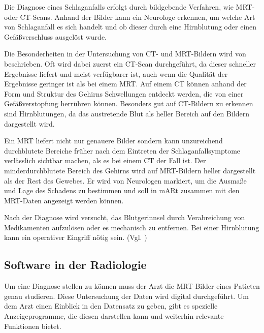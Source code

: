Die Diagnose eines Schlaganfalls erfolgt durch bildgebende Verfahren, wie MRT- oder CT-Scans. Anhand der Bilder kann ein Neurologe erkennen, um welche Art von Schlaganfall es sich handelt und ob dieser durch eine Hirnblutung oder einen Gefäßverschluss ausgelöst wurde. 

Die Besonderheiten in der Untersuchung von CT- und MRT-Bildern wird von \citet{schlaganfallBilder} beschrieben.
Oft wird dabei zuerst ein CT-Scan durchgeführt, da dieser schneller Ergebnisse liefert und meist verfügbarer ist, auch wenn die Qualität der Ergebnisse geringer ist als bei einem MRT. 
Auf einem CT können anhand der Form und Struktur des Gehirns Schwellungen entdeckt werden, die von einer Gefäßverstopfung herrühren können. Besonders gut auf CT-Bildern zu erkennen sind Hirnblutungen, da das austretende Blut als heller Bereich auf den Bildern dargestellt wird. 

Ein MRT liefert nicht nur genauere Bilder sondern kann unzureichend durchblutete Bereiche früher nach dem Eintreten der Schlaganfallsymptome verlässlich sichtbar machen, als es bei einem CT der Fall ist.
Der minderdurchblutete Bereich des Gehirns wird auf MRT-Bildern heller dargestellt als der Rest des Gewebes. Er wird von Neurologen markiert, um die Ausmaße und Lage des Schadens zu bestimmen und soll in mARt zusammen mit den MRT-Daten angezeigt werden können.

Nach der Diagnose wird versucht, das Blutgerinnsel durch Verabreichung von Medikamenten aufzulösen oder es mechanisch zu entfernen. Bei einer Hirnblutung kann ein operativer Eingriff nötig sein.
(Vgl. \citet{schlaganfallBehandlung})

\subsection{Software in der Radiologie}
\label{radiologieSoftware}
Um eine Diagnose stellen zu können muss der Arzt die MRT-Bilder eines Patieten genau studieren. Diese Untersuchung der Daten wird digital durchgeführt. Um dem Arzt einen Einblick in den Datensatz zu geben, gibt es spezielle Anzeigeprogramme, die diesen darstellen kann und weiterhin relevante Funktionen bietet. 
  
